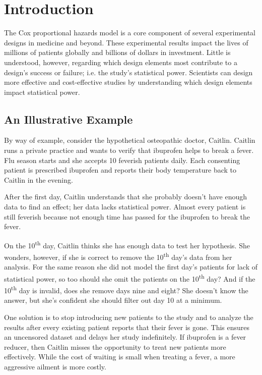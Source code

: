 \section{Introduction}

The Cox proportional hazards model \cite{cox} is a core component of several experimental designs in medicine and beyond. These experimental results impact the lives of millions of patients globally and billions of dollars in investment. Little is understood, however, regarding which design elements most contribute to a design's success or failure; i.e. the study's statistical power. Scientists can design more effective and cost-effective studies by understanding which design elements impact statistical power.

\subsection{An Illustrative Example}

By way of example, consider the hypothetical osteopathic doctor, Caitlin. Caitlin runs a private practice and wants to verify that ibuprofen helps to break a fever. Flu season starts and she accepts 10 feverish patients daily. Each consenting patient is prescribed ibuprofen and reports their body temperature back to Caitlin in the evening. 

After the first day, Caitlin understands that she probably doesn't have enough data to find an effect; her data lacks statistical power. Almost every patient is still feverish because not enough time has passed for the ibuprofen to break the fever. 

On the 10\textsuperscript{th} day, Caitlin thinks she has enough data to test her hypothesis. She wonders, however, if she is correct to remove the 10\textsuperscript{th} day's data from her analysis. For the same reason she did not model the first day's patients for lack of statistical power, so too should she omit the patients on the 10\textsuperscript{th} day? And if the 10\textsuperscript{th} day is invalid, does she remove days nine and eight? She doesn't know the answer, but she's confident she should filter out day 10 at a minimum. 

One solution is to stop introducing new patients to the study and to analyze the results after every existing patient reports that their fever is gone. This ensures an uncensored dataset and delays her study indefinitely. If ibuprofen is a fever reducer, then Caitlin misses the opportunity to treat new patients more effectively. While the cost of waiting is small when treating a fever, a more aggressive ailment is more costly. 

